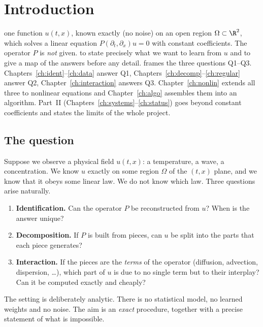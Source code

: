 \chapter{Introduction}\label{ch:intro}
\chapterbrief
{one function $u(t,x)$, known exactly (no noise) on an open region $\Omega\subset\R^2$, which solves a linear equation $P(\partial_t,\partial_x)u=0$ with constant coefficients. The operator $P$ is \emph{not} given.}
{to state precisely what we want to learn from $u$ and to give a map of the answers before any detail.}
{frames the three questions Q1--Q3. Chapters~\ref{ch:ident}--\ref{ch:data} answer Q1, Chapters~\ref{ch:decomp}--\ref{ch:regular} answer Q2, Chapter~\ref{ch:interaction} answers Q3. Chapter~\ref{ch:nonlin} extends all three to nonlinear equations and Chapter~\ref{ch:algo} assembles them into an algorithm. Part~II (Chapters~\ref{ch:systems}--\ref{ch:status}) goes beyond constant coefficients and states the limits of the whole project.}

\section{The question}

Suppose we observe a physical field $u(t,x)$: a temperature, a wave, a concentration. We know $u$ exactly on some region $\Omega$ of the $(t,x)$ plane, and we know that it obeys some linear law. We do not know which law. Three questions arise naturally.

\begin{enumerate}[label=\textbf{Q\arabic*.},leftmargin=1.2cm]
\item \textbf{Identification.} Can the operator $P$ be reconstructed from $u$? When is the answer unique?
\item \textbf{Decomposition.} If $P$ is built from pieces, can $u$ be split into the parts that each piece generates?
\item \textbf{Interaction.} If the pieces are the \emph{terms} of the operator (diffusion, advection, dispersion, \dots), which part of $u$ is due to no single term but to their interplay? Can it be computed exactly and cheaply?
\end{enumerate}

The setting is deliberately analytic. There is no statistical model, no learned weights and no noise. The aim is an \emph{exact} procedure, together with a precise statement of what is impossible.

